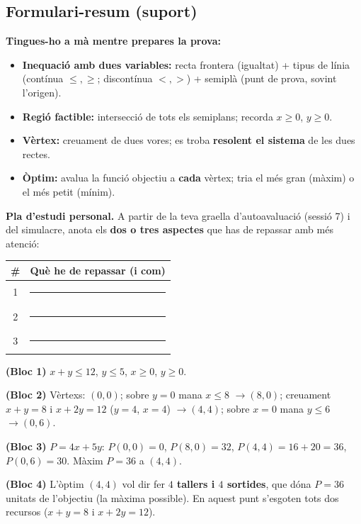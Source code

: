 \subsection{Formulari-resum (suport)}

\begin{idea}
\textbf{Tingues-ho a mà mentre prepares la prova:}
\begin{itemize}[leftmargin=1.4em, itemsep=2pt]
  \item \textbf{Inequació amb dues variables:} recta frontera (igualtat) + tipus de
        línia (contínua $\le,\ge$; discontínua $<,>$) + semiplà (punt de prova, sovint
        l'origen).
  \item \textbf{Regió factible:} intersecció de tots els semiplans; recorda
        $x\ge 0$, $y\ge 0$.
  \item \textbf{Vèrtex:} creuament de dues vores; es troba \textbf{resolent el
        sistema} de les dues rectes.
  \item \textbf{Òptim:} avalua la funció objectiu a \textbf{cada} vèrtex; tria el més
        gran (màxim) o el més petit (mínim).
\end{itemize}
\end{idea}

\noindent\textbf{Pla d'estudi personal.} A partir de la teva graella d'autoavaluació
(sessió 7) i del simulacre, anota els \textbf{dos o tres aspectes} que has de repassar
amb més atenció:
\begin{center}
\renewcommand{\arraystretch}{1.5}
\begin{tabular}{c p{10.5cm}}
\toprule
\textbf{\#} & \textbf{Què he de repassar (i com)} \\
\midrule
1 & \rule{9.8cm}{0.4pt} \\
2 & \rule{9.8cm}{0.4pt} \\
3 & \rule{9.8cm}{0.4pt} \\
\bottomrule
\end{tabular}
\end{center}

\begin{solucions}
\begin{sollist}
  \item \textbf{(Bloc 1)} $x+y\le 12$, \;$y\le 5$, \;$x\ge 0$, \;$y\ge 0$.
  \item \textbf{(Bloc 2)} Vèrtexs: $(0,0)$; sobre $y=0$ mana $x\le 8$ $\rightarrow
        (8,0)$; creuament $x+y=8$ i $x+2y=12$ ($y=4$, $x=4$) $\rightarrow (4,4)$; sobre
        $x=0$ mana $y\le 6$ $\rightarrow (0,6)$.
  \item \textbf{(Bloc 3)} $P=4x+5y$: $P(0,0)=0$, $P(8,0)=32$, $P(4,4)=16+20=36$,
        $P(0,6)=30$. Màxim $P=36$ a $(4,4)$.
  \item \textbf{(Bloc 4)} L'òptim $(4,4)$ vol dir fer \textbf{$4$ tallers i $4$
        sortides}, que dóna $P=36$ unitats de l'objectiu (la màxima possible). En aquest
        punt s'esgoten tots dos recursos ($x+y=8$ i $x+2y=12$).
\end{sollist}
\end{solucions}
